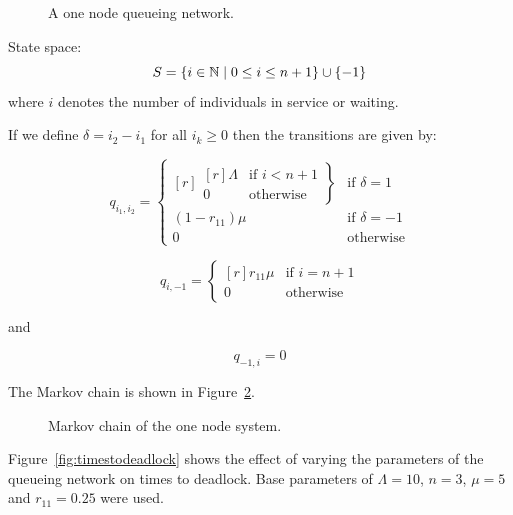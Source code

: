 \documentclass{article}
\begin{document}
\begin{figure}[!htbp]
  
  \caption{A one node queueing network.}
  \label{fig:queueingnetwork_1node}
\end{figure}

State space:
        \[S = \{i\in\mathbb{N} \nonscript\; | \nonscript\; 0 \leq i \leq n + 1
        \}\cup\{-1\}\]
where \(i\) denotes the number of individuals in service or waiting.

If we define $\delta = i_2 - i_1$ for all $i_k \geq 0$ then the transitions are given by:

\begin{equation}
  q_{i_1, i_2} = \left\{
  \begin{matrix*}[ r ]
    \left. \begin{matrix*}[ r ]
      \Lambda & \text{if } i < n + 1 \\
      0 & \text{otherwise}
    \end{matrix*} \right\} & \text{if } \delta = 1 \\
    (1 - r_{11})\mu & \text{if } \delta = -1 \\
    0 & \text{otherwise}
  \end{matrix*} \right.
\end{equation}

\begin{equation}
  q_{i, -1} = \left\{
  \begin{matrix*}[ r ]
    r_{11}\mu & \text{if } i = n + 1 \\
    0 & \text{otherwise}
  \end{matrix*}
  \right.
\end{equation}

and

\begin{equation}
  q_{-1, i} = 0
\end{equation}

The Markov chain is shown in Figure~\ref{fig:1nodeMC}.

\begin{figure}[!htbp]
    
    \caption{Markov chain of the one node system.}
    \label{fig:1nodeMC}
\end{figure}

Figure~\ref{fig:timestodeadlock} shows the effect of varying the parameters of the queueing network on times to deadlock.
Base parameters of $\Lambda = 10$, $n = 3$, $\mu = 5$ and $r_{11} = 0.25$ were used.
\end{document}
